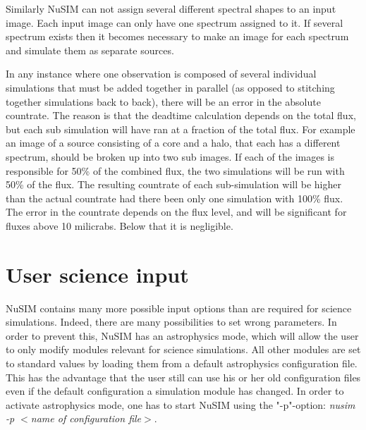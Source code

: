 Similarly NuSIM can not assign several different spectral shapes to an input image. Each input image can only have one spectrum assigned to it. If several spectrum exists then it becomes necessary to make an image for each spectrum and simulate them as separate sources.

In any instance where one observation is composed of several individual simulations that must be added together in parallel (as opposed to stitching together simulations back to back), there will be an error in the absolute countrate. The reason is that the deadtime calculation depends on the total flux, but each sub simulation will have ran at a fraction of the total flux. For example an image of a source consisting of a core and a halo, that each has a different spectrum, should be broken up into two sub images. If each of the images is responsible for 50\% of the combined flux, the two simulations will be run with 50\% of the flux. The resulting countrate of each sub-simulation will be higher than the actual countrate had there been only one simulation with 100\% flux. The error in the countrate depends on the flux level, and will be significant for fluxes above 10 milicrabs. Below that it is negligible.  


\section{User science input}

NuSIM contains many more possible input options than are required for science simulations. 
Indeed, there are many possibilities to set wrong parameters.
In order to prevent this, NuSIM has an astrophysics mode, which will allow the user to only modify modules relevant for science simulations.
All other modules are set to standard values by loading them from a default astrophysics configuration file.
This has the advantage that the user still can use his or her old configuration files even if the default configuration a simulation module has changed.
In order to activate astrophysics mode, one has to start NuSIM using the "-p"-option: \emph{nusim -p $<$name of configuration file$>$}. 

